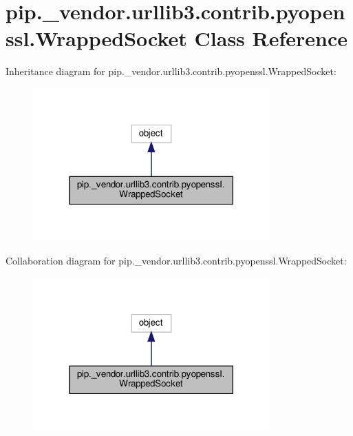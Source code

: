 \hypertarget{classpip_1_1__vendor_1_1urllib3_1_1contrib_1_1pyopenssl_1_1WrappedSocket}{}\section{pip.\+\_\+vendor.\+urllib3.\+contrib.\+pyopenssl.\+Wrapped\+Socket Class Reference}
\label{classpip_1_1__vendor_1_1urllib3_1_1contrib_1_1pyopenssl_1_1WrappedSocket}


Inheritance diagram for pip.\+\_\+vendor.\+urllib3.\+contrib.\+pyopenssl.\+Wrapped\+Socket\+:
\nopagebreak
\begin{figure}[H]
\begin{center}
\leavevmode
\includegraphics[width=258pt]{classpip_1_1__vendor_1_1urllib3_1_1contrib_1_1pyopenssl_1_1WrappedSocket__inherit__graph}
\end{center}
\end{figure}


Collaboration diagram for pip.\+\_\+vendor.\+urllib3.\+contrib.\+pyopenssl.\+Wrapped\+Socket\+:
\nopagebreak
\begin{figure}[H]
\begin{center}
\leavevmode
\includegraphics[width=258pt]{classpip_1_1__vendor_1_1urllib3_1_1contrib_1_1pyopenssl_1_1WrappedSocket__coll__graph}
\end{center}
\end{figure}
